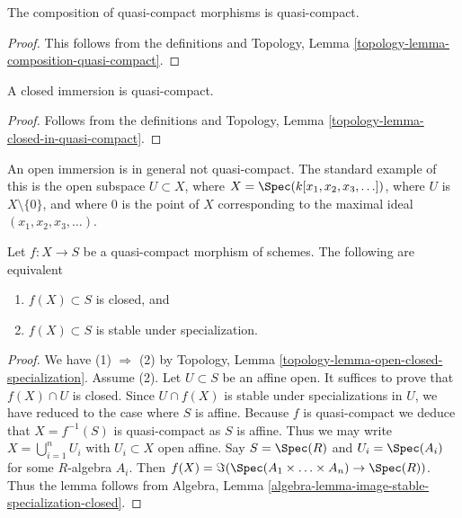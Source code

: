 \begin{lemma}
\label{lemma-composition-quasi-compact}
The composition of quasi-compact morphisms is quasi-compact.
\end{lemma}

\begin{proof}
This follows from the definitions and
Topology, Lemma \ref{topology-lemma-composition-quasi-compact}.
\end{proof}

\begin{lemma}
\label{lemma-closed-immersion-quasi-compact}
A closed immersion is quasi-compact.
\end{lemma}

\begin{proof}
Follows from the definitions and
Topology, Lemma \ref{topology-lemma-closed-in-quasi-compact}.
\end{proof}

\begin{example}
\label{example-open-immersion-not-quasi-compact}
An open immersion is in general not quasi-compact.
The standard example of this is the open subspace
$U \subset X$, where $X = \Spec(k[x_1, x_2, x_3, \ldots])$,
where $U$ is $X \setminus \{0\}$, and where $0$ is the point
of $X$ corresponding to the maximal ideal
$(x_1, x_2, x_3, \ldots)$.
\end{example}

\begin{lemma}
\label{lemma-image-quasi-compact-closed}
Let $f : X \to S$ be a quasi-compact morphism of schemes.
The following are equivalent
\begin{enumerate}
\item $f(X) \subset S$ is closed, and
\item $f(X) \subset S$ is stable under specialization.
\end{enumerate}
\end{lemma}

\begin{proof}
We have (1) $\Rightarrow$ (2) by
Topology, Lemma \ref{topology-lemma-open-closed-specialization}.
Assume (2). Let $U \subset S$ be an affine open. It suffices to prove
that $f(X) \cap U$ is closed. Since $U \cap f(X)$ is stable under
specializations in $U$, we have reduced to the case where $S$ is affine.
Because $f$ is quasi-compact we deduce that $X = f^{-1}(S)$ is
quasi-compact as $S$ is affine. Thus we may write
$X = \bigcup_{i = 1}^n U_i$ with $U_i \subset X$ open affine.
Say $S = \Spec(R)$ and
$U_i = \Spec(A_i)$ for some $R$-algebra $A_i$.
Then $f(X) = \Im(\Spec(A_1 \times \ldots \times A_n)
\to \Spec(R))$. Thus the lemma follows from
Algebra, Lemma \ref{algebra-lemma-image-stable-specialization-closed}.
\end{proof}

